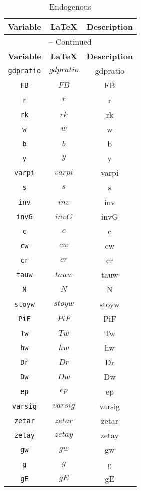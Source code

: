\begin{center}
\begin{longtable}{ccc}
\caption{Endogenous}\\%
\hline%
\multicolumn{1}{c}{\textbf{Variable}} &
\multicolumn{1}{c}{\textbf{\LaTeX}} &
\multicolumn{1}{c}{\textbf{Description}}\\%
\hline\hline%
\endfirsthead
\multicolumn{3}{c}{{\tablename} \thetable{} -- Continued}\\%
\hline%
\multicolumn{1}{c}{\textbf{Variable}} &
\multicolumn{1}{c}{\textbf{\LaTeX}} &
\multicolumn{1}{c}{\textbf{Description}}\\%
\hline\hline%
\endhead
\texttt{gdpratio} & $gdpratio$ & gdpratio\\
\texttt{FB} & $FB$ & FB\\
\texttt{r} & $r$ & r\\
\texttt{rk} & $rk$ & rk\\
\texttt{w} & $w$ & w\\
\texttt{b} & $b$ & b\\
\texttt{y} & $y$ & y\\
\texttt{varpi} & $varpi$ & varpi\\
\texttt{s} & $s$ & s\\
\texttt{inv} & $inv$ & inv\\
\texttt{invG} & $invG$ & invG\\
\texttt{c} & $c$ & c\\
\texttt{cw} & $cw$ & cw\\
\texttt{cr} & $cr$ & cr\\
\texttt{tauw} & $tauw$ & tauw\\
\texttt{N} & $N$ & N\\
\texttt{stoyw} & $stoyw$ & stoyw\\
\texttt{PiF} & $PiF$ & PiF\\
\texttt{Tw} & $Tw$ & Tw\\
\texttt{hw} & $hw$ & hw\\
\texttt{Dr} & $Dr$ & Dr\\
\texttt{Dw} & $Dw$ & Dw\\
\texttt{ep} & $ep$ & ep\\
\texttt{varsig} & $varsig$ & varsig\\
\texttt{zetar} & $zetar$ & zetar\\
\texttt{zetay} & $zetay$ & zetay\\
\texttt{gw} & $gw$ & gw\\
\texttt{g} & $g$ & g\\
\texttt{gE} & $gE$ & gE\\

\end{longtable}
\end{center}
